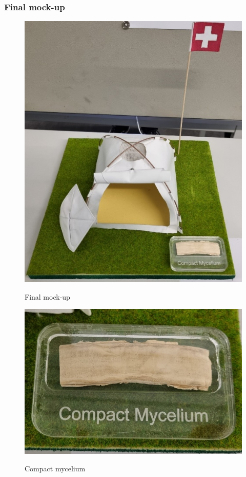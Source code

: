 \documentclass{article}
\begin{document}
\subsubsection{Final mock-up}
\begin{figure}[ht!]
    \centering
    \begin{minipage}{0.45\textwidth}
        \centering
        \includegraphics[width=.8\textwidth]{media/final_mockup.png}
        \label{fig:final_mockup}
        \caption{Final mock-up}
    \end{minipage}%
    \hfill
    \begin{minipage}{0.45\textwidth}
        \centering
        \includegraphics[width=\textwidth]{media/compact_myc.png}
        \label{fig:compact_myc}
        \caption{Compact mycelium}
    \end{minipage}
\end{figure}
\end{document}

